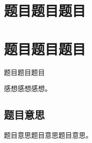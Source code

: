 \def\sectionName{题目题目题目}



\isBeamerMode\relax
    \section[\TOCName]{\sectionName}
\fi
\isBeamerMode\relax
    \section[\TOCName\ -\ \sectionName]{\sectionName}
\fi

\begin{frame}

\isBeamerMode\relax
    {\Huge \sectionName}\par
\fi




感想感想感想。



\end{frame}

\subsection{题目意思}
\begin{frame} %
题目意思题目意思题目意思。
\end{frame}



